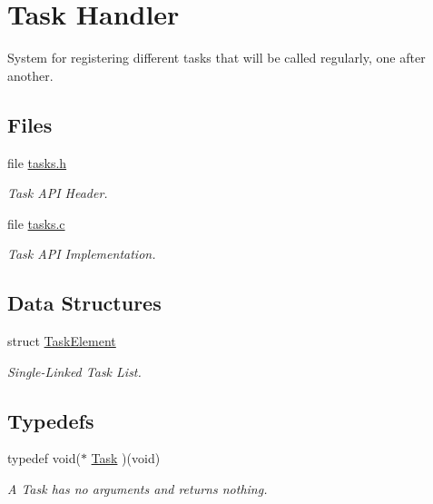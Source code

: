 \hypertarget{group__task}{\section{Task Handler}
\label{group__task}
}


System for registering different tasks that will be called regularly, one after another.  


\subsection*{Files}
\begin{DoxyCompactItemize}
\item 
file \hyperlink{tasks_8h}{tasks.\-h}
\begin{DoxyCompactList}\small\item\em Task A\-P\-I Header. \end{DoxyCompactList}\item 
file \hyperlink{tasks_8c}{tasks.\-c}
\begin{DoxyCompactList}\small\item\em Task A\-P\-I Implementation. \end{DoxyCompactList}\end{DoxyCompactItemize}
\subsection*{Data Structures}
\begin{DoxyCompactItemize}
\item 
struct \hyperlink{struct_task_element}{Task\-Element}
\begin{DoxyCompactList}\small\item\em Single-\/\-Linked Task List. \end{DoxyCompactList}\end{DoxyCompactItemize}
\subsection*{Typedefs}
\begin{DoxyCompactItemize}
\item 
typedef void($\ast$ \hyperlink{group__task_gaa9c5b8d3ac838189ed335dbe4ec9fa6b}{Task} )(void)
\begin{DoxyCompactList}\small\item\em A Task has no arguments and returns nothing. \end{DoxyCompactList}\end{DoxyCompactItemize}
